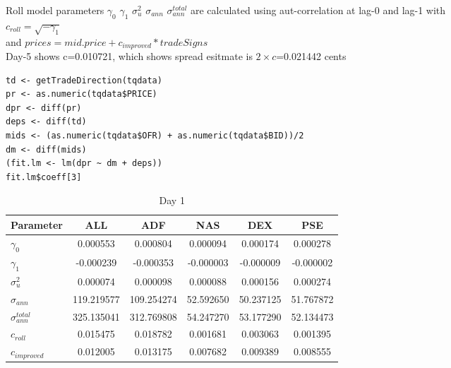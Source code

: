 \documentclass{article}
\begin{document}
Roll model parameters $\gamma_0$ $\gamma_1$ $\sigma^2_u$ $\sigma_{ann}$ $\sigma_{ann}^{total}$ are calculated using aut-correlation at lag-0 and lag-1 with \\
$c_{roll}=\sqrt{-\gamma_1}$ \\
and 
$prices = mid.price + c_{improved} * tradeSigns$ \\

Day-5 shows c=0.010721, which shows spread esitmate is $2 \times c$=0.021442 cents

\begin{lstlisting}
td <- getTradeDirection(tqdata)
pr <- as.numeric(tqdata$PRICE)
dpr <- diff(pr)
deps <- diff(td)
mids <- (as.numeric(tqdata$OFR) + as.numeric(tqdata$BID))/2
dm <- diff(mids)
(fit.lm <- lm(dpr ~ dm + deps))
fit.lm$coeff[3]
\end{lstlisting}

\begin{table}[H]
\begin{adjustbox}{width=\textwidth}
\begin{tabular}{lccccc}
\toprule
\textbf{Parameter} & \textbf{ALL} & \textbf{ADF} & \textbf{NAS} & \textbf{DEX} & \textbf{PSE} \\
\midrule
\texttt{$\gamma_0$}       & 0.000553  & 0.000804  & 0.000094  & 0.000174  & 0.000278  \\
\texttt{$\gamma_1$}       & -0.000239 & -0.000353 & -0.000003 & -0.000009 & -0.000002 \\
\texttt{$\sigma^2_u$}        & 0.000074  & 0.000098  & 0.000088  & 0.000156  & 0.000274  \\
\texttt{$\sigma_{ann}$}      & 119.219577 & 109.254274 & 52.592650 & 50.237125 & 51.767872 \\
\texttt{$\sigma_{ann}^{total}$}& 325.135041 & 312.769808 & 54.247270 & 53.177290 & 52.134473 \\
\texttt{$c_{roll}$}      & 0.015475	& 0.018782 &	0.001681 &	0.003063 &	0.001395  \\
\texttt{$c_{improved}$}  & 0.012005  & 0.013175  & 0.007682  & 0.009389  & 0.008555  \\
\bottomrule
\end{tabular}
\end{adjustbox}
\caption{Day 1}
\label{tab:day1_volatility}
\end{table}
\end{document}
